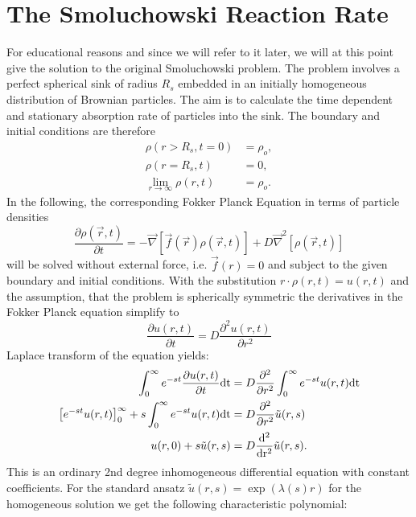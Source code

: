 \section{The Smoluchowski Reaction Rate}
For educational reasons and since we will refer to it later, we will at this point give the solution to the original Smoluchowski problem.
The problem involves a perfect spherical sink of radius $R_s$ embedded in an initially homogeneous distribution of Brownian particles. The aim is to calculate the time dependent and stationary absorption rate of particles into the sink.
The boundary and initial conditions are therefore
\begin{align}
    \rho(r > R_s, t = 0) &= \rho_o, \\
    \rho(r=R_s,t) &= 0, \\
    \lim_{r \rightarrow \infty} \rho(r, t) &= \rho_o.
    \label{BC}
\end{align}
In the following, the corresponding Fokker Planck Equation in terms of particle densities
\begin{equation}
        \frac{\partial \rho(\vec{r},t)}{\partial t} = - \vec \nabla \left[ \vec f(\vec{r})\rho(\vec{r},t) \right] + D\vec \nabla ^2 \left[\rho(\vec{r},t) \right] 
    \label{FPE3}
\end{equation}
will be solved without external force, i.e. $\vec f(r) = 0$ and subject to the given boundary and initial conditions.
With the substitution $r \cdot \rho(r,t) = u(r,t)$ and the assumption, that the problem is spherically symmetric the derivatives in the Fokker Planck equation simplify to
\begin{equation}
    \frac{\partial u(r,t)}{\partial t} = D \frac{\partial ^2 u(r,t)}{\partial r^2}
    \label{Simplified FPE}
\end{equation}
Laplace transform of the equation yields:
\begin{align}
    \int_0^\infty e^{-st}\frac{\partial u(r,t)}{\partial t} \rm{d} t &= D \frac{\partial ^2 }{\partial r^2} \int_0^\infty e^{-st} u(r,t) \rm{d} t \\
    \left[e^{-st} u(r,t) \right]_0^\infty + s \int_0^\infty e^{-st} u(r,t) \rm{d} t &= D \frac{\partial^2}{\partial r^2} \tilde{u}(r,s)\\
    u(r,0) + s \tilde{u}(r,s) &= D \frac{\rm{d}^2}{\rm{d} r^2} \tilde{u}(r,s).
\end{align}
This is an ordinary 2nd degree inhomogeneous differential equation with constant coefficients.
For the standard ansatz $\tilde{u}(r,s) = \exp(\lambda(s) r)$ for the homogeneous solution we get the following characteristic polynomial:
